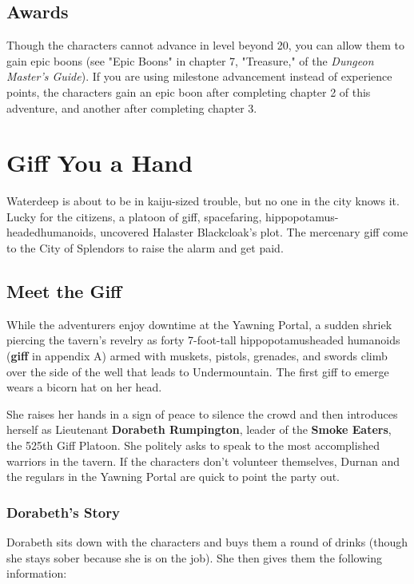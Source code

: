 \documentclass[10pt,a4paper,twoside,bg=print,twocolumn,openany,nodeprecatedcode]{dndbook}
\begin{document}
\section{Awards}
Though the characters cannot advance in level beyond 20, you can allow them to gain epic boons (see "Epic Boons" in chapter 7, "Treasure," of the \textit{Dungeon Master's Guide}). If you are using milestone advancement instead of experience points, the characters gain an epic boon after completing chapter 2 of this adventure, and another after completing chapter 3.

\chapter{Giff You a Hand}
Waterdeep is about to be in kaiju-sized trouble, but no one in the city knows it. Lucky for the citizens, a platoon of giff, spacefaring, hippopotamus-headedhumanoids, uncovered Halaster Blackcloak's plot. The mercenary giff come to the City of Splendors to raise the alarm and get paid.

\section{Meet the Giff}
While the adventurers enjoy downtime at the Yawning Portal, a sudden shriek piercing the tavern's revelry as forty 7-foot-tall hippopotamusheaded humanoids (\textbf{giff} in appendix A) armed with muskets, pistols, grenades, and swords climb over  the side of the well that leads to Undermountain. The  first giff to emerge wears a bicorn hat on her head.

She raises her hands in a sign of peace to silence the crowd and then introduces herself as Lieutenant \textbf{Dorabeth Rumpington}, leader of the \textbf{Smoke Eaters}, the 525th Giff Platoon. She politely asks to speak to the most accomplished warriors in the tavern. If the characters don't volunteer themselves, Durnan and the regulars in the Yawning Portal are quick to point the party out.

\subsection{Dorabeth's Story}
Dorabeth sits down with the characters and buys them a round of drinks (though she stays sober because she is on the job). She then gives them the following information:
\end{document}
